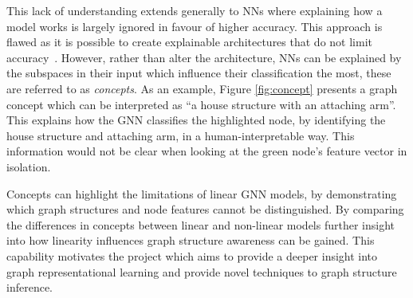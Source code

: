 This lack of understanding extends generally to NNs where explaining how a model works is largely ignored in favour of higher accuracy.
This approach is flawed as it is possible to create explainable architectures that do not limit accuracy~\cite{zarlenga2022concept}.
However, rather than alter the architecture, NNs can be explained by the subspaces in their input which influence their classification the most, these are referred to as \emph{concepts}.
As an example, Figure \ref{fig:concept} presents a graph concept which can be interpreted as ``a house structure with an attaching arm''.
This explains how the GNN classifies the highlighted node, by identifying the house structure and attaching arm, in a human-interpretable way.
This information would not be clear when looking at the green node's feature vector in isolation.

Concepts can highlight the limitations of linear GNN models, by demonstrating which graph structures and node features cannot be distinguished.
By comparing the differences in concepts between linear and non-linear models further insight into how linearity influences graph structure awareness can be gained. 
This capability motivates the project which aims to provide a deeper insight into graph representational learning and provide novel techniques to graph structure inference.


